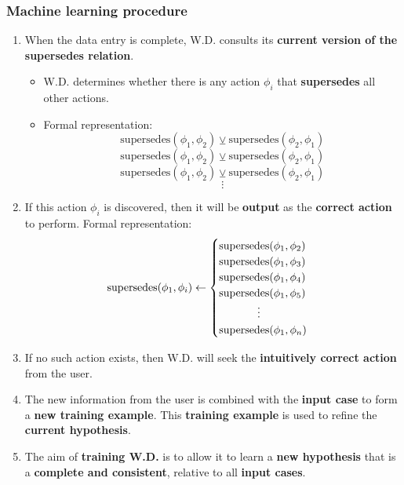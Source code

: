\documentclass[11pt]{article}
\begin{document}
\subsubsection{Machine learning procedure}
\label{sec:org6d97fbf}
\begin{enumerate}
\item When the data entry is complete, W.D. consults its \textbf{current version of the supersedes relation}.
\begin{itemize}
\item W.D. determines whether there is any action \(\phi_i\) that \textbf{supersedes} all other actions.
\item Formal representation:
\[\text{supersedes}(\phi_1, \phi_2) \veebar \text{supersedes}(\phi_2 , \phi_1)\]
\[\text{supersedes}(\phi_1, \phi_2) \veebar \text{supersedes}(\phi_2 , \phi_1)\]
\[\text{supersedes}(\phi_1, \phi_2) \veebar \text{supersedes}(\phi_2 , \phi_1)\]
\[\vdots\]
\end{itemize}
\item If this action \(\phi_i\) is discovered, then it will be \textbf{output} as the \textbf{correct action} to perform.
Formal representation:
\begin{displaymath}
\text{supersedes}(\phi_1, \phi_i) \leftarrow \begin{cases}
\text{supersedes}(\phi_1, \phi_2) \\
\text{supersedes}(\phi_1, \phi_3) \\
\text{supersedes}(\phi_1, \phi_4) \\
\text{supersedes}(\phi_1, \phi_5) \\
\hspace*{3.5em} \vdots \\
\text{supersedes}(\phi_1, \phi_n) \\
\end{cases}
\end{displaymath}
\item If no such action exists, then W.D. will seek the \textbf{intuitively correct action} from the user.
\item The new information from the user is combined with the \textbf{input case} to form a \textbf{new training example}. This \textbf{training example} is used to refine the \textbf{current hypothesis}.
\item The aim of \textbf{training W.D.} is to allow it to learn a \textbf{new hypothesis} that is a \textbf{complete and consistent}, relative to all \textbf{input cases}.
\end{enumerate}
\end{document}
